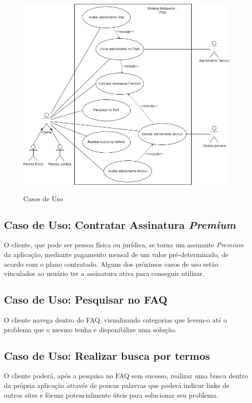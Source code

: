 \begin{figure}[h]
\caption{Casos de Uso}

\centering %
\includegraphics[width=15cm]{LaTeX/metaversoIFSP/anexos/Casos de Uso.jpeg} %
\label{caso-de-uso}
\end{figure}

\subsection{Caso de Uso: Contratar Assinatura \textit{Premium}}
O cliente, que pode ser pessoa física ou jurídica, se torna um assinante \textit{Premium} da aplicação, mediante pagamento mensal de um valor pré-determinado, de acordo com o plano contratado. Alguns dos próximos casos de uso estão vinculados ao usuário ter a assinatura ativa para conseguir utilizar.

\subsection{Caso de Uso: Pesquisar no FAQ}
O cliente navega dentro do FAQ, visualizando categorias que levem-o até o problema que o mesmo tenha e disponibilize uma solução.

\subsection{Caso de Uso: Realizar busca por termos}
O cliente poderá, após a pesquisa no FAQ sem sucesso, realizar uma busca dentro da própria aplicação através de poucas palavras que poderá indicar links de outros sites e fóruns potencialmente úteis para solucionar seu problema.

